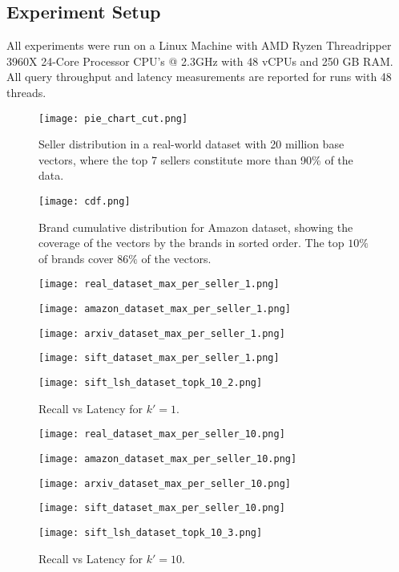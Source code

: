 \subsection{Experiment Setup} 
All experiments were run on a Linux Machine with AMD Ryzen Threadripper 3960X 24-Core Processor CPU's @ 2.3GHz with 48 vCPUs and 250 GB RAM. All query throughput and latency measurements are reported for runs with 48 threads.

\begin{figure*}[t]
     \centering
    \begin{minipage}{0.40\textwidth}
    \texttt{[image: pie\_chart\_cut.png]}
\caption{Seller distribution in a real-world dataset with 20 million base vectors, where the top 7 sellers constitute more than 90\% of the data.}
\label{fig:percentage}
    \end{minipage}
    \hspace{1cm}
    \begin{minipage}{0.50\textwidth}
    \texttt{[image: cdf.png]}
\caption{Brand cumulative distribution for Amazon dataset, showing the coverage of the vectors by the brands in sorted order. The top $10\%$ of brands cover $86\%$ of the vectors.}
\label{fig:percentage2}
    \end{minipage}
\end{figure*}

\begin{figure*}[!ht]
     \centering
    \begin{minipage}{0.42\textwidth}
        \centering
\texttt{[image: real\_dataset\_max\_per\_seller\_1.png]}

\texttt{[image: amazon\_dataset\_max\_per\_seller\_1.png]}

\texttt{[image: arxiv\_dataset\_max\_per\_seller\_1.png]}

\texttt{[image: sift\_dataset\_max\_per\_seller\_1.png]}

\texttt{[image: sift\_lsh\_dataset\_topk\_10\_2.png]}
    \caption{Recall vs Latency for $k'=1$.}
 \label{fig:recall-latency-1}
    \end{minipage}   
    \begin{minipage}{0.42\textwidth}
        \centering
\texttt{[image: real\_dataset\_max\_per\_seller\_10.png]}

\texttt{[image: amazon\_dataset\_max\_per\_seller\_10.png]}

\texttt{[image: arxiv\_dataset\_max\_per\_seller\_10.png]}

\texttt{[image: sift\_dataset\_max\_per\_seller\_10.png]}

\texttt{[image: sift\_lsh\_dataset\_topk\_10\_3.png]}
    
\caption{Recall vs Latency for $k'=10$.}
\label{fig:recall-latency-10}
\end{minipage}
\end{figure*}

